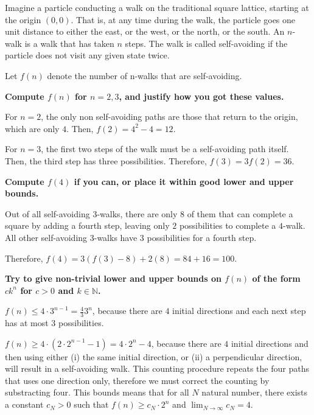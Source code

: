 \documentclass[letterpaper]{article}
\begin{document}
Imagine a particle conducting a walk on the traditional square lattice, starting at the origin $(0, 0)$. That is, at any time during the walk, the particle goes one unit distance to either the east, or the west, or the north, or the south. An $n$-walk is a walk that has taken $n$ steps. The walk is called self-avoiding if the particle does not visit any given state twice.

Let $f(n)$ denote the number of n-walks that are self-avoiding.

\textbf{Compute $f(n)$ for $n = 2, 3$, and justify how you got these values.}

For $n = 2$, the only non self-avoiding paths are those that return to the origin, which are only $4$. Then, $f(2) = 4^2 - 4 = 12$.

For $n = 3$, the first two steps of the walk must be a self-avoiding path itself. Then, the third step has three possibilities. Therefore, $f(3) = 3 f(2) = 36$.


\textbf{Compute $f(4)$ if you can, or place it within good lower and upper bounds.}

Out of all self-avoiding $3$-walks, there are only $8$ of them that can complete a square by adding a fourth step, leaving only $2$ possibilities to complete a $4$-walk. All other self-avoiding $3$-walks have $3$ possibilities for a fourth step.

Therefore, $f(4) =3(f(3) - 8) + 2(8) = 84 + 16 = 100$.


\textbf{Try to give non-trivial lower and upper bounds on $f(n)$ of the form $c k^n$ for $c > 0$ and $k \in \mathbb{N}$.}

$f(n) \le 4 \cdot 3^{n-1} = \frac{4}{3} 3^n$, because there are $4$ initial directions and each next step has at most $3$ possibilities.

$f(n) \ge 4 \cdot (2 \cdot 2^{n - 1} - 1) = 4 \cdot 2^n - 4$, because there are $4$ initial directions and then using either (i) the same initial direction, or (ii) a perpendicular direction, will result in a self-avoiding walk. This counting procedure repeats the four paths that uses one direction only, therefore we must correct the counting by substracting four. This bounds means that for all $N$ natural number, there exists a constant $c_N > 0$ such that $f(n) \ge c_N \cdot 2^n$ and $\lim_{N \to \infty} c_N = 4$.
\end{document}
